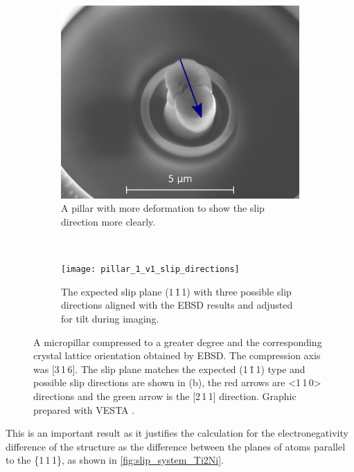 \begin{figure}
\centering
\begin{subfigure}{0.4\textwidth}
    \centering
    \includegraphics[width=\textwidth]{pillar_1_v1}
    \caption{A pillar with more deformation to show the slip direction more clearly.}
\end{subfigure}
~
\begin{subfigure}{0.4\textwidth}
    \centering
    \texttt{[image: pillar\_1\_v1\_slip\_directions]}
    \caption{The expected slip plane  (1\,\={1}\,1) with three possible slip directions aligned with the EBSD results and adjusted for tilt during imaging.}
\end{subfigure}
\caption[A compressed micropillar of  showing the slip direction.]{A micropillar compressed to a greater degree and the corresponding crystal lattice orientation obtained by EBSD. The compression axis was [3\,1\,6]. The slip plane matches the expected (1\,\={1}\,1) type and possible slip directions are shown in (b), the red arrows are <1\,1\,0> directions and the green arrow is the [2\,1\,1] direction. Graphic prepared with VESTA \cite{Momma2011}.\label{fig:slip_direction}}
\end{figure}

This is an important result as it justifies the calculation for the electronegativity difference of the structure as the difference between the planes of atoms parallel to the \{1\,1\,1\}, as shown in \autoref{fig:slip_system_Ti2Ni}.







